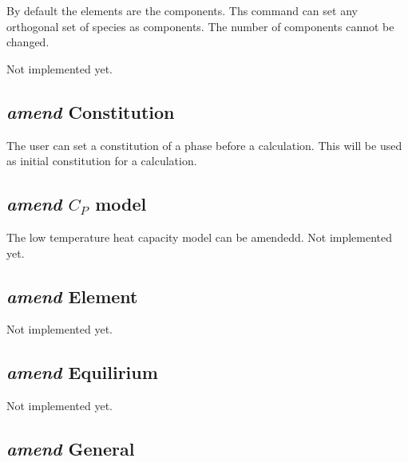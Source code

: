 \documentclass[12pt]{article}
\begin{document}
By default the elements are the components.  Ths command can set any
orthogonal set of species as components.  The number of components
cannot be changed.

Not implemented yet.

\subsection{{\em amend} Constitution}

The user can set a constitution of a phase before a calculation.  This
will be used as initial constitution for a calculation.

\subsection{{\em amend} $C_P$ model}

The low temperature heat capacity model can be amendedd.  Not
implemented yet.

\subsection{{\em amend} Element}

Not implemented yet.

\subsection{{\em amend} Equilirium}

Not implemented yet.

\subsection{{\em amend} General}
\end{document}
